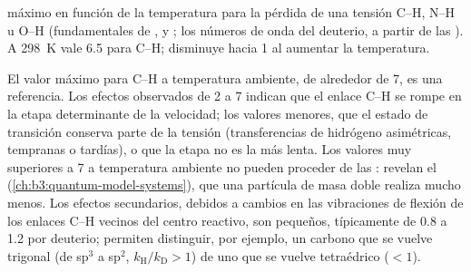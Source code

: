 \begin{omfigure}

{\small {} máximo en función de la temperatura para la pérdida
de una tensión C--H, N--H u O--H (fundamentales de ,  y ; los
números de onda del deuterio, a partir de las ). A \qty{298}{K} vale 6.5 para C--H;
disminuye hacia 1 al aumentar la temperatura.}
\end{omfigure}

El valor máximo para C--H a temperatura ambiente, de alrededor de 7, es una referencia. Los efectos
observados de 2 a 7 indican que el enlace C--H se rompe en la etapa determinante de la
velocidad; los valores menores, que el estado de transición conserva parte de la tensión
(transferencias de hidrógeno asimétricas, tempranas o tardías), o que la etapa no es la
más lenta. Los valores muy superiores a 7 a temperatura ambiente no pueden proceder de las
: revelan el  (\cref{ch:b3:quantum-model-systems}),
que una partícula de masa doble realiza mucho menos. Los efectos secundarios, debidos a
cambios en las vibraciones de flexión de los enlaces C--H vecinos del centro reactivo,
son pequeños, típicamente de 0.8 a 1.2 por deuterio; permiten distinguir, por ejemplo, un
carbono que se vuelve trigonal (de sp$^3$ a sp$^2$, $k_{\mathrm H}/k_{\mathrm D} > 1$) de uno que se vuelve
tetraédrico ($< 1$).

